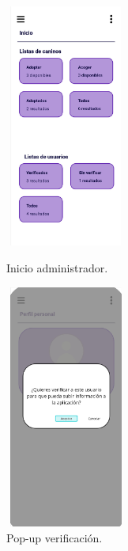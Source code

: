 \documentclass[a4paper, 12pt]{article}
\begin{document}
\begin{figure}[H]
   	\begin{minipage}{0.48\textwidth}
		\begin{center}
			{\includegraphics[height=8cm, width=4cm]{design/AdminPage.jpg}\par}
			\caption{Inicio administrador.}
			\medskip
		\end{center}  
	\end{minipage}\hfill
   	\begin{minipage}{0.48\textwidth}
		\begin{center}
			{\includegraphics[height=8cm, width=4cm]{design/VerifyAction.jpg}\par}
			\caption{Pop-up verificación.}
			\medskip
		\end{center}  
	\end{minipage}\hfill
\end{figure}
\end{document}
